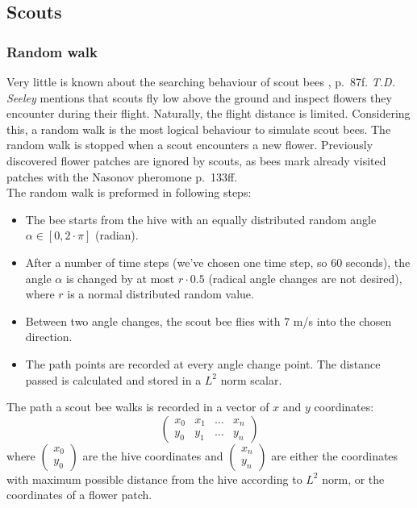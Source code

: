	
\subsection{Scouts}
	\subsubsection{Random walk}
		Very little is known about the searching behaviour of scout bees \cite{seeley95}, p.~87f. \textit{T.D. Seeley} mentions that scouts fly low above the ground and inspect flowers they encounter during their flight. Naturally, the flight distance is limited. Considering this, a random walk is the most logical behaviour to simulate scout bees. The random walk is stopped when a scout encounters a new flower. Previously discovered flower patches are ignored by scouts, as bees mark already visited patches with the Nasonov pheromone \cite{winston91} p.~133ff.\\
		The random walk is preformed in following steps:
		\begin{itemize}
			\item The bee starts from the hive with an equally distributed random angle $\alpha \in [0, 2 \cdot \pi]$ (radian).
			\item After a number of time steps (we've chosen one time step, so 60 seconds), the angle $\alpha$ is changed by at most $r\cdot0.5$ (radical angle changes are not desired), where $r$ is a normal distributed random value.
			\item Between two angle changes, the scout bee flies with 7 m/s into the chosen direction.
			\item The path points are recorded at every angle change point. The distance passed is calculated and stored in a $L^2$ norm scalar.
		\end{itemize}
		
		The path a scout bee walks is recorded in a vector of $x$ and $y$ coordinates:
		\[\begin{pmatrix}
			x_0 & x_1 & \ldots & x_n \\ y_0 & y_1 & \ldots & y_n
		\end{pmatrix}\]
		where $\begin{pmatrix} x_0 \\ y_0 \end{pmatrix}$ are the hive coordinates and $\begin{pmatrix} x_n \\ y_n \end{pmatrix}$ are either the coordinates with maximum possible distance from the hive according to $L^2$ norm, or the coordinates of a flower patch.\\
		

